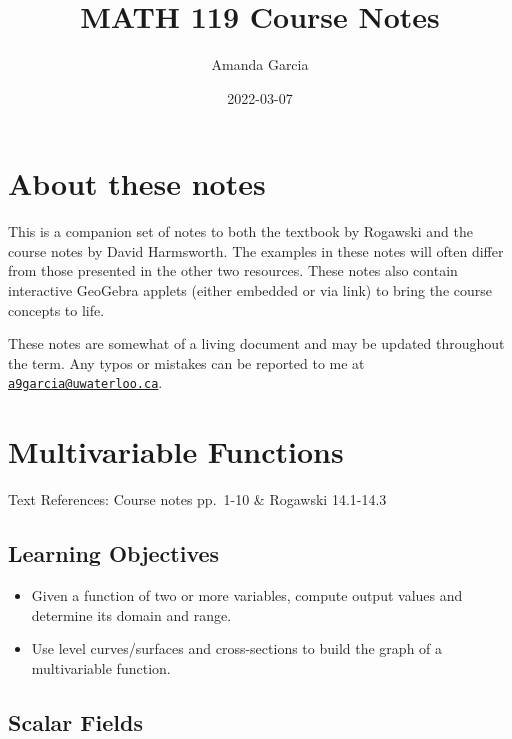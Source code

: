 \documentclass[
]{book}
\title{MATH 119 Course Notes}
\author{Amanda Garcia}
\date{2022-03-07}
\providecommand{\tightlist}{%
  \setlength{\itemsep}{0pt}\setlength{\parskip}{0pt}}
\theoremstyle{definition}
\theoremstyle{definition}
\theoremstyle{definition}
\theoremstyle{definition}
\theoremstyle{remark}
\begin{document}
\maketitle

{
\setcounter{tocdepth}{1}
\tableofcontents
}
\hypertarget{about-these-notes}{%
\chapter*{About these notes}\label{about-these-notes}}

This is a companion set of notes to both the textbook by Rogawski and the course notes by David Harmsworth. The examples in these notes will often differ from those presented in the other two resources. These notes also contain interactive GeoGebra applets (either embedded or via link) to bring the course concepts to life.

These notes are somewhat of a living document and may be updated throughout the term. Any typos or mistakes can be reported to me at \href{mailto:a9garcia@uwaterloo.ca}{\nolinkurl{a9garcia@uwaterloo.ca}}.

\hypertarget{lec-1}{%
\chapter{Multivariable Functions}\label{lec-1}}

Text References: Course notes pp.~1-10 \& Rogawski 14.1-14.3

\hypertarget{learning-objectives}{%
\section{Learning Objectives}\label{learning-objectives}}

\begin{itemize}
\tightlist
\item
  Given a function of two or more variables, compute output values and determine its domain and range.
\item
  Use level curves/surfaces and cross-sections to build the graph of a multivariable function.
\end{itemize}

\hypertarget{scalar-fields}{%
\section{Scalar Fields}\label{scalar-fields}}
\end{document}
